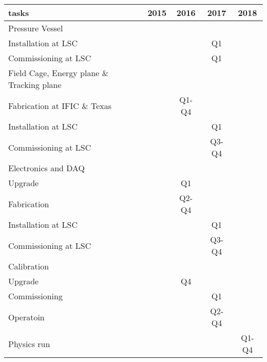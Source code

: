 \begin{center}
\begin{tabular}{| l | c | c | c | c |}
\hline
tasks & 2015 & 2016 & 2017 & 2018 \\
\hline
Pressure Vessel & & & &   \\
\hline
Installation at LSC &  & & Q1& \\
Commissioning at LSC & & &Q1 & \\
\hline
Field Cage, Energy plane \& Tracking plane & & & &  \\
\hline
Fabrication at IFIC \& Texas & & Q1-Q4 & & \\
Installation at LSC &  & &Q1 & \\
Commissioning at LSC &  & & Q3-Q4& \\
\hline
Electronics and DAQ & & & &   \\
\hline
Upgrade & & Q1 & & \\
Fabrication & & Q2-Q4 & & \\
Installation at LSC & & & Q1& \\
Commissioning at LSC & & & Q3-Q4 & \\
\hline
Calibration & & & &   \\
\hline
Upgrade & & Q4& & \\
Commissioning & & & Q1 & \\
Operatoin & & & Q2-Q4 & \\
\hline
Physics run & & & &  Q1-Q4 \\
\hline
\end{tabular}
\label{tab:schedule_next}
\end{center}
